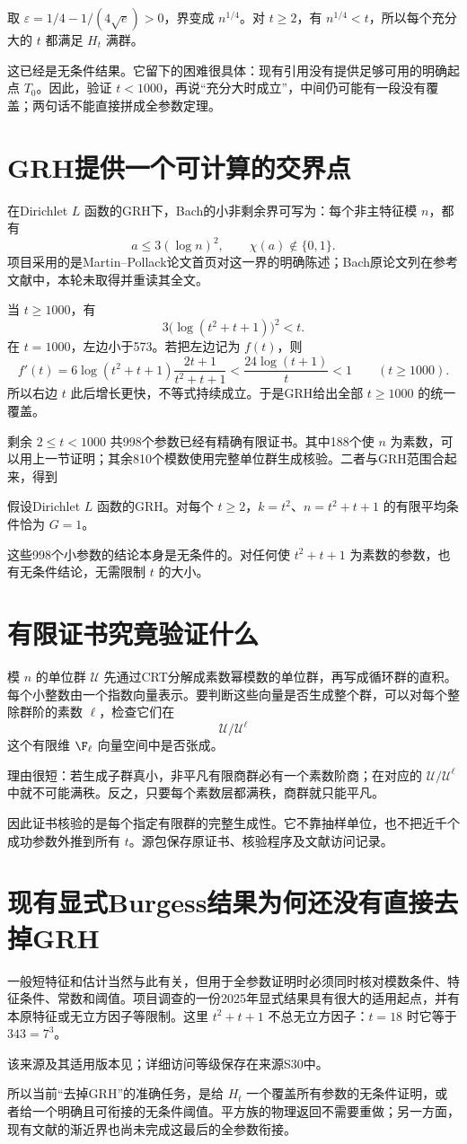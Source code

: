 取 $\varepsilon=1/4-1/(4\sqrt e)>0$，界变成 $n^{1/4}$。对 $t\ge2$，有 $n^{1/4}<t$，所以每个充分大的 $t$ 都满足 $H_t$ 满群。

这已经是无条件结果。它留下的困难很具体：现有引用没有提供足够可用的明确起点 $T_0$。因此，验证 $t<1000$，再说“充分大时成立”，中间仍可能有一段没有覆盖；两句话不能直接拼成全参数定理。

\section{GRH提供一个可计算的交界点}
在Dirichlet $L$ 函数的GRH下，Bach的小非剩余界可写为：每个非主特征模 $n$，都有
\[a\le3(\log n)^2,\qquad\chi(a)\notin\{0,1\}.
\]
项目采用的是Martin--Pollack论文首页对这一界的明确陈述；Bach原论文列在参考文献中，本轮未取得并重读其全文。\cite{MartinPollack2013,Bach1990}

当 $t\ge1000$，有
\[3\bigl(\log(t^2+t+1)\bigr)^2<t.
\]
在 $t=1000$，左边小于573。若把左边记为 $f(t)$，则
\[f'(t)=6\log(t^2+t+1)\frac{2t+1}{t^2+t+1}
<\frac{24\log(t+1)}t<1\qquad(t\ge1000).
\]
所以右边 $t$ 此后增长更快，不等式持续成立。于是GRH给出全部 $t\ge1000$ 的统一覆盖。

剩余 $2\le t<1000$ 共998个参数已经有精确有限证书。其中188个使 $n$ 为素数，可以用上一节证明；其余810个模数使用完整单位群生成核验。二者与GRH范围合起来，得到
\begin{theorem}[平方族的条件性完成]
假设Dirichlet $L$ 函数的GRH。对每个 $t\ge2$，$k=t^2$、$n=t^2+t+1$ 的有限平均条件恰为 $G=1$。
\end{theorem}
这些998个小参数的结论本身是无条件的。对任何使 $t^2+t+1$ 为素数的参数，也有无条件结论，无需限制 $t$ 的大小。

\section{有限证书究竟验证什么}
模 $n$ 的单位群 $\mathcal U$ 先通过CRT分解成素数幂模数的单位群，再写成循环群的直积。每个小整数由一个指数向量表示。要判断这些向量是否生成整个群，可以对每个整除群阶的素数 $\ell$，检查它们在
\[\mathcal U/\mathcal U^\ell
\]
这个有限维 $\F_\ell$ 向量空间中是否张成。

理由很短：若生成子群真小，非平凡有限商群必有一个素数阶商；在对应的 $\mathcal U/\mathcal U^\ell$ 中就不可能满秩。反之，只要每个素数层都满秩，商群就只能平凡。

因此证书核验的是每个指定有限群的完整生成性。它不靠抽样单位，也不把近千个成功参数外推到所有 $t$。源包保存原证书、核验程序及文献访问记录。

\section{现有显式Burgess结果为何还没有直接去掉GRH}
一般短特征和估计当然与此有关，但用于全参数证明时必须同时核对模数条件、特征条件、常数和阈值。项目调查的一份2025年显式结果具有很大的适用起点，并有本原特征或无立方因子等限制。这里 $t^2+t+1$ 不总无立方因子：$t=18$ 时它等于 $343=7^3$。

该来源及其适用版本见\cite{ExplicitBurgess2025}；详细访问等级保存在来源S30中。

所以当前“去掉GRH”的准确任务，是给 $H_t$ 一个覆盖所有参数的无条件证明，或者给一个明确且可衔接的无条件阈值。平方族的物理返回不需要重做；另一方面，现有文献的渐近界也尚未完成这最后的全参数衔接。
